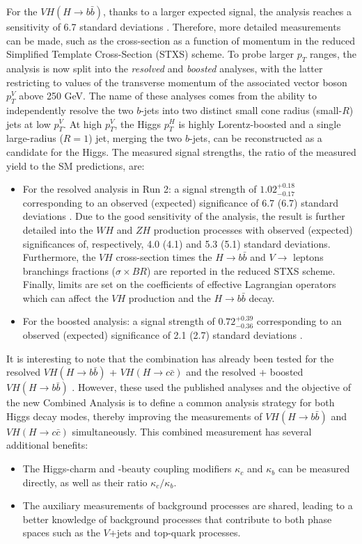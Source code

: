 For the $VH (H\rightarrow b\bar{b})$, thanks to a larger expected signal, the analysis reaches a sensitivity of 6.7 standard deviations \cite{ATLAS:2020fcp}. Therefore, more detailed measurements can be made, such as the cross-section as a function of momentum in the reduced Simplified Template Cross-Section (STXS) scheme. To probe larger $p_T$ ranges, the analysis is now split into the \textit{resolved} \cite{ATLAS:2020fcp} and \textit{boosted} \cite{ATLAS:2020jwz} analyses, with the latter restricting to values of the transverse momentum of the associated vector boson $p_T^V$ above 250 GeV. The name of these analyses comes from the ability to independently resolve the two $b$-jets into two distinct small cone radius (small-$R$) jets at low $p_T^V$. At high $p_T^V$, the Higgs $p_T^H$ is highly Lorentz-boosted and a single large-radius ($R = 1$) jet, merging the two $b$-jets, can be reconstructed as a candidate for the Higgs. The measured signal strengths, the ratio of the measured yield to the SM predictions, are: 
\begin{itemize}
\item For the resolved analysis in Run 2: a signal strength of $1.02_{-0.17}^{+0.18}$ corresponding to an observed (expected) significance of 6.7 (6.7) standard deviations \cite{ATLAS:2020fcp}. Due to the good sensitivity of the analysis, the result is further detailed into the $WH$ and $ZH$ production processes with observed (expected) significances of, respectively, 4.0 (4.1) and 5.3 (5.1) standard deviations. Furthermore, the $VH$ cross-section times the $H \rightarrow b\bar{b}$ and $V\rightarrow$ leptons branchings fractions ($\sigma \times BR$) are reported in the reduced STXS scheme. Finally, limits are set on the coefficients of effective Lagrangian operators which can affect the $VH$ production and the $H \rightarrow b\bar{b}$ decay.
\item For the boosted analysis: a signal strength of  $0.72_{-0.36}^{+0.39}$ corresponding to an observed (expected) significance of 2.1 (2.7) standard deviations \cite{ATLAS:2020jwz}.
\end{itemize}

It is interesting to note that the combination has already been tested for the resolved $VH (H\rightarrow b\bar{b})$ + $VH (H\rightarrow c\bar{c})$ \cite{Collaboration:2721696} and the resolved + boosted $VH (H \rightarrow b\bar{b})$ \cite{ATLAS:2021wqh}. However, these used the published analyses and the objective of the new Combined Analysis is to define a common analysis strategy for both Higgs decay modes, thereby improving the measurements of $VH (H \rightarrow b\bar{b})$ and $VH (H \rightarrow c\bar{c})$ simultaneously. This combined measurement has several additional benefits: 
\begin{itemize}
\item The Higgs-charm and -beauty coupling modifiers $\kappa_c$ and $\kappa_b$ can be measured directly, as well as their ratio $\kappa_c/\kappa_b$. 
\item The auxiliary measurements of background processes are shared, leading to a better knowledge of background processes that contribute to both phase spaces such as the $V$+jets and top-quark processes.
\end{itemize}

